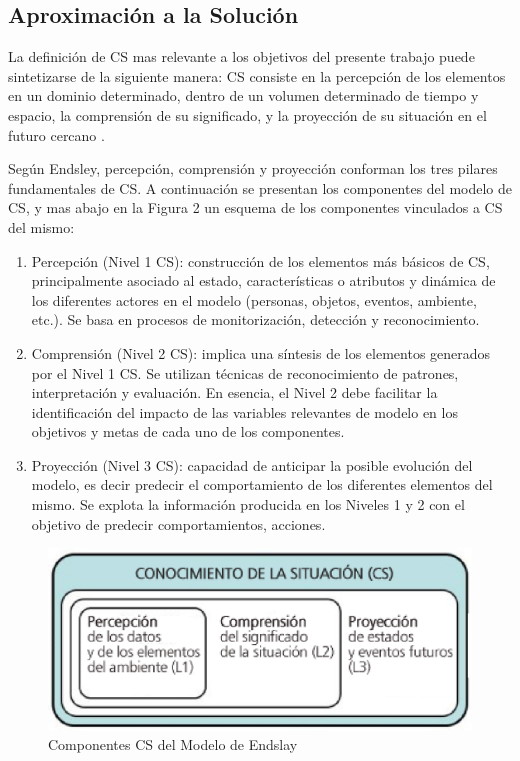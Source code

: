 \documentclass[a4paper]{./plantillas/llncs}
\begin{document}
\subsection{Aproximación a la Solución}

La definición de CS mas relevante a los objetivos del presente trabajo puede sintetizarse de la siguiente manera: CS consiste en la percepción de los elementos en un dominio determinado, dentro de un volumen determinado de tiempo y espacio, la comprensión de su significado, y la proyección de su situación en el futuro cercano \cite{b2}.

Según Endsley, percepción, comprensión y proyección conforman los tres pilares fundamentales de CS. A continuación se presentan los componentes del modelo de CS, y mas abajo en la Figura 2 un esquema de los componentes vinculados a CS del mismo:

\begin{enumerate}
\item Percepción (Nivel 1 CS): construcción de los elementos más básicos de CS, principalmente asociado al estado, características o atributos y dinámica de los diferentes actores en el modelo (personas, objetos, eventos, ambiente, etc.). Se basa en procesos de monitorización, detección y reconocimiento. 
\item Comprensión (Nivel 2 CS): implica una síntesis de los elementos generados por el Nivel 1 CS. Se utilizan técnicas de reconocimiento de patrones, interpretación y evaluación. En esencia, el Nivel 2 debe facilitar la identificación del impacto de las variables relevantes de modelo en los objetivos y metas de cada uno de los componentes. 
\item Proyección (Nivel 3 CS): capacidad de anticipar la posible evolución del modelo, es decir predecir el comportamiento de los diferentes elementos del mismo. Se explota la información producida en los Niveles 1 y 2 con el objetivo de predecir comportamientos, acciones.
\end{enumerate}


\begin{figure}
\centering
\includegraphics[scale=0.5]{./img/1-cs}
\caption{Componentes CS del Modelo de Endslay}
\end{figure}
\end{document}
